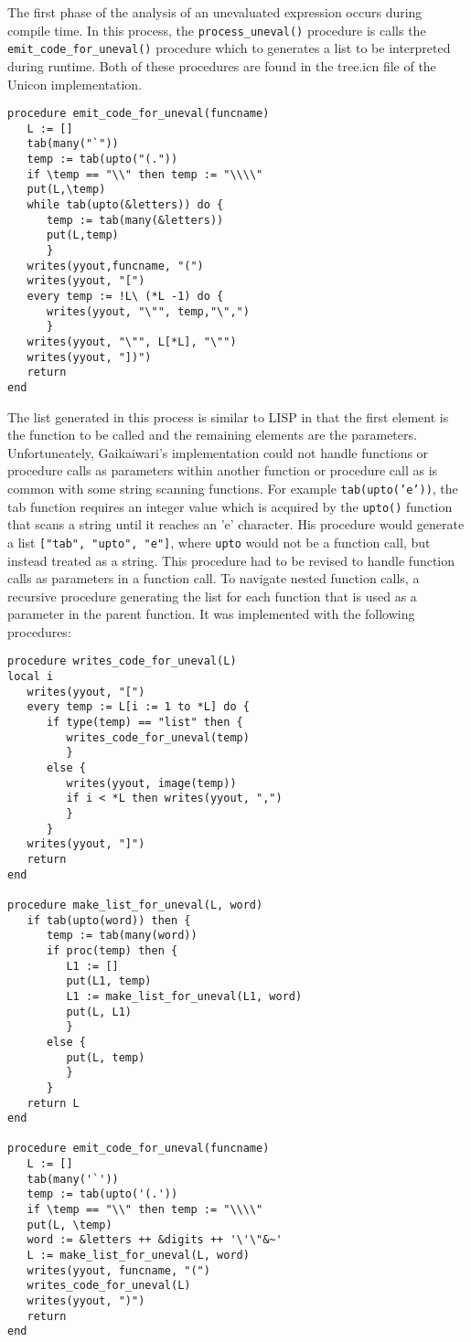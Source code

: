 \documentclass{article}
\begin{document}
The first phase of the analysis of an unevaluated expression occurs during compile time.  In this process, the \texttt{process\_uneval()} procedure is calls the \texttt{emit\_code\_for\_uneval()} procedure which to generates a list to be interpreted during runtime.  Both of these procedures are found in the tree.icn file of the Unicon implementation.
\begin{verbatim}
procedure emit_code_for_uneval(funcname)
   L := []
   tab(many("`"))
   temp := tab(upto("(.")) 
   if \temp == "\\" then temp := "\\\\"
   put(L,\temp)
   while tab(upto(&letters)) do {
      temp := tab(many(&letters))
      put(L,temp)
      }
   writes(yyout,funcname, "(")
   writes(yyout, "[")
   every temp := !L\ (*L -1) do {
      writes(yyout, "\"", temp,"\",")
      }
   writes(yyout, "\"", L[*L], "\"")
   writes(yyout, "])")
   return
end
\end{verbatim}
The list generated in this process is similar to LISP in that the first element is the function to be called and the remaining elements are the parameters.  Unfortuneately, Gaikaiwari's implementation could not handle functions or procedure calls as parameters within another function or procedure call as is common with some string scanning functions.  For example \texttt{tab(upto('e'))}, the tab function requires an integer value which is acquired by the \texttt{upto()} function that scans a string until it reaches an 'e' character.  His procedure would generate a list \texttt{["tab", "upto", "e"]}, where \texttt{upto} would not be a function call, but instead treated as a string.  This procedure had to be revised to handle function calls as parameters in a function call.  To navigate nested function calls, a recursive procedure generating the list for each function that is used as a parameter in the parent function.  It was implemented with the following procedures: 
\begin{verbatim}
procedure writes_code_for_uneval(L)
local i
   writes(yyout, "[")
   every temp := L[i := 1 to *L] do {
      if type(temp) == "list" then {
         writes_code_for_uneval(temp)
         } 
      else {
         writes(yyout, image(temp))
         if i < *L then writes(yyout, ",")
         }
      }
   writes(yyout, "]")
   return
end

procedure make_list_for_uneval(L, word)
   if tab(upto(word)) then {
      temp := tab(many(word))
      if proc(temp) then {
         L1 := []
         put(L1, temp)
         L1 := make_list_for_uneval(L1, word)
         put(L, L1)
         }
      else {
         put(L, temp)
         }
      }
   return L
end

procedure emit_code_for_uneval(funcname)
   L := []
   tab(many('`'))
   temp := tab(upto('(.')) 
   if \temp == "\\" then temp := "\\\\"
   put(L, \temp)
   word := &letters ++ &digits ++ '\'\"&~'
   L := make_list_for_uneval(L, word)
   writes(yyout, funcname, "(")
   writes_code_for_uneval(L)
   writes(yyout, ")")
   return
end
\end{verbatim}
\end{document}
